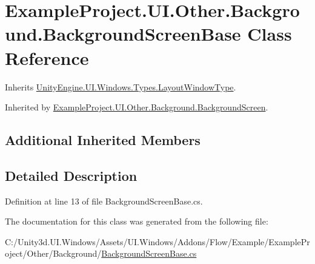 \hypertarget{class_example_project_1_1_u_i_1_1_other_1_1_background_1_1_background_screen_base}{}\section{Example\+Project.\+U\+I.\+Other.\+Background.\+Background\+Screen\+Base Class Reference}
\label{class_example_project_1_1_u_i_1_1_other_1_1_background_1_1_background_screen_base}


Inherits \hyperlink{class_unity_engine_1_1_u_i_1_1_windows_1_1_types_1_1_layout_window_type}{Unity\+Engine.\+U\+I.\+Windows.\+Types.\+Layout\+Window\+Type}.



Inherited by \hyperlink{class_example_project_1_1_u_i_1_1_other_1_1_background_1_1_background_screen}{Example\+Project.\+U\+I.\+Other.\+Background.\+Background\+Screen}.

\subsection*{Additional Inherited Members}


\subsection{Detailed Description}


Definition at line 13 of file Background\+Screen\+Base.\+cs.



The documentation for this class was generated from the following file\+:\begin{DoxyCompactItemize}
\item 
C\+:/\+Unity3d.\+U\+I.\+Windows/\+Assets/\+U\+I.\+Windows/\+Addons/\+Flow/\+Example/\+Example\+Project/\+Other/\+Background/\hyperlink{_background_screen_base_8cs}{Background\+Screen\+Base.\+cs}\end{DoxyCompactItemize}
